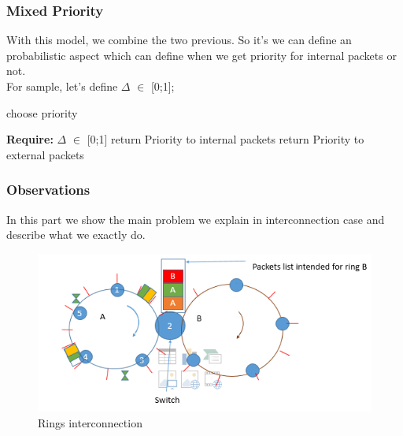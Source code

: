 \documentclass{article}
\begin{document}
\subsubsection{Mixed Priority}
With this model, we combine the two previous. So it's we can define an probabilistic aspect which can define when we get priority for internal packets or not.\\
 For sample, let's define  \textbf{$\Delta$} $\in$ [0;1]; \\

\begin{algorithm}
\caption{choose priority}
\begin{algorithmic}
\State \textbf{Require:} $\Delta$ $\in$ [0;1]
\State return Priority to internal packets
\Else
\State return Priority to external packets
\EndIf
\end{algorithmic}
\end{algorithm}  


\subsubsection{Observations}
In this part we show the main problem we explain in interconnection case and describe what we exactly do.\\
\begin{figure}[h!]
\begin{center}
\includegraphics[scale=0.8]{inter1.PNG}
\caption{Rings interconnection}
\end{center}
\end{figure}
\end{document}
